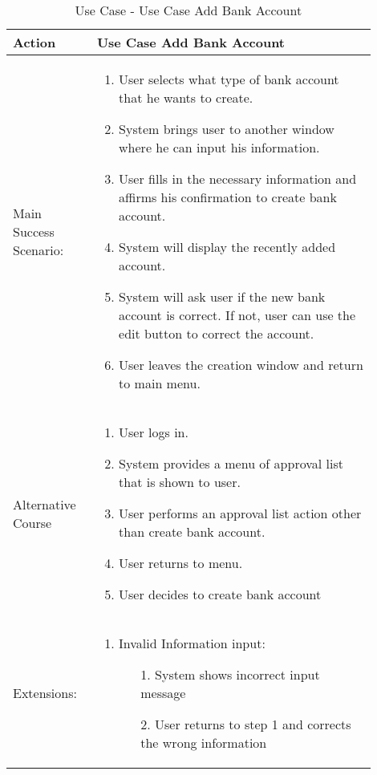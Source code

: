 \documentclass{article}
\newcounter{use case ID}
\newcommand\tabularhead[1]{
\begin{table}[ht]
    \addtocounter{use case ID}{1}
    \caption{Use Case \arabic{use case ID} - #1}
    \vspace{0.2cm}
    \begin{tabular}{|p{0.2\linewidth}|p{0.70\linewidth}|}
    \hline
        \textbf{Action} & \textbf{#1} \\
        \hline}
\newcommand\addrow[2]{#1 & #2\\ \hline}
\newcommand\addmulrow[2]{ \begin{minipage}[t][][t]{2.5cm}#1\end{minipage}
        &\begin{minipage}[t][][t]{11cm}
        \begin{enumerate}[itemsep=-1ex] #2   \end{enumerate}
    \end{minipage}\vfill\\ \hline}
\newenvironment{usecase}{\tabularhead}
{\hline\end{tabular}\end{table}}
\begin{document}
\begin{usecase}{Use Case Add Bank Account}
\addmulrow{Main Success Scenario:}{
	\item User selects what type of bank account that he wants to create.
	\item System brings user to another window where he can input his information.
	\item User fills in the necessary information and affirms his confirmation to create bank account.
	\item System will display the recently added account.
	\item System will ask user if the new bank account is correct. If not, user can use the edit button to correct the account.
	\item User leaves the creation window and return to main menu.
}
\addmulrow{Alternative Course}{
    \item User logs in.
    \item System provides a menu of approval list that is shown to user.
    \item User performs an approval list action other than create bank account.
    \item User returns to menu.
    \item User decides to create bank account
}
\addmulrow{Extensions:}{
	\item Invalid Information input:
		\begin{enumerate}
		\item[1.] System shows incorrect input message
		\item[2.] User returns to step 1 and corrects the wrong information
		\end{enumerate}

}

\end{usecase}
\end{document}
